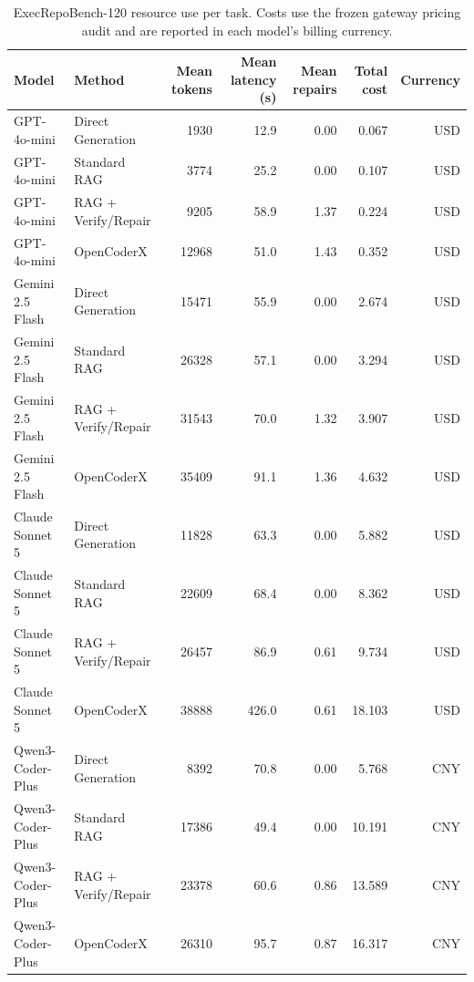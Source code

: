 \begin{table}[t]
\centering
\scriptsize
\caption{ExecRepoBench-120 resource use per task. Costs use the frozen gateway pricing audit and are reported in each model's billing currency.}
\label{tab:resources_final}
\begin{tabular}{llrrrrr}
\toprule
Model & Method & Mean tokens & Mean latency (s) & Mean repairs & Total cost & Currency \\
\midrule
GPT-4o-mini & Direct Generation & 1930 & 12.9 & 0.00 & 0.067 & USD \\
GPT-4o-mini & Standard RAG & 3774 & 25.2 & 0.00 & 0.107 & USD \\
GPT-4o-mini & RAG + Verify/Repair & 9205 & 58.9 & 1.37 & 0.224 & USD \\
GPT-4o-mini & OpenCoderX & 12968 & 51.0 & 1.43 & 0.352 & USD \\
\midrule
Gemini 2.5 Flash & Direct Generation & 15471 & 55.9 & 0.00 & 2.674 & USD \\
Gemini 2.5 Flash & Standard RAG & 26328 & 57.1 & 0.00 & 3.294 & USD \\
Gemini 2.5 Flash & RAG + Verify/Repair & 31543 & 70.0 & 1.32 & 3.907 & USD \\
Gemini 2.5 Flash & OpenCoderX & 35409 & 91.1 & 1.36 & 4.632 & USD \\
\midrule
Claude Sonnet 5 & Direct Generation & 11828 & 63.3 & 0.00 & 5.882 & USD \\
Claude Sonnet 5 & Standard RAG & 22609 & 68.4 & 0.00 & 8.362 & USD \\
Claude Sonnet 5 & RAG + Verify/Repair & 26457 & 86.9 & 0.61 & 9.734 & USD \\
Claude Sonnet 5 & OpenCoderX & 38888 & 426.0 & 0.61 & 18.103 & USD \\
\midrule
Qwen3-Coder-Plus & Direct Generation & 8392 & 70.8 & 0.00 & 5.768 & CNY \\
Qwen3-Coder-Plus & Standard RAG & 17386 & 49.4 & 0.00 & 10.191 & CNY \\
Qwen3-Coder-Plus & RAG + Verify/Repair & 23378 & 60.6 & 0.86 & 13.589 & CNY \\
Qwen3-Coder-Plus & OpenCoderX & 26310 & 95.7 & 0.87 & 16.317 & CNY \\
\bottomrule
\end{tabular}
\end{table}
